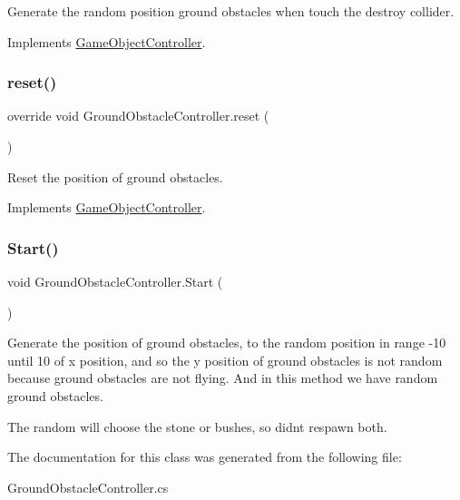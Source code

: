 Generate the random position ground obstacles when touch the destroy collider. 



Implements \hyperlink{class_game_object_controller_a0d186d143e280869efaff7835730fc82}{Game\+Object\+Controller}.

\hypertarget{class_ground_obstacle_controller_ab218c8d1be89a93ab3c0a18ba3fc9d67}{}\label{class_ground_obstacle_controller_ab218c8d1be89a93ab3c0a18ba3fc9d67} 
\subsubsection{\texorpdfstring{reset()}{reset()}}
{\footnotesize\ttfamily override void Ground\+Obstacle\+Controller.\+reset (\begin{DoxyParamCaption}{ }\end{DoxyParamCaption})\hspace{0.3cm}{\ttfamily [virtual]}}



Reset the position of ground obstacles. 



Implements \hyperlink{class_game_object_controller_a5e57dfd66120a1400e5947f5664a41e4}{Game\+Object\+Controller}.

\hypertarget{class_ground_obstacle_controller_ac03d4b2a3dc70e560a8ffa100035400e}{}\label{class_ground_obstacle_controller_ac03d4b2a3dc70e560a8ffa100035400e} 
\subsubsection{\texorpdfstring{Start()}{Start()}}
{\footnotesize\ttfamily void Ground\+Obstacle\+Controller.\+Start (\begin{DoxyParamCaption}{ }\end{DoxyParamCaption})\hspace{0.3cm}{\ttfamily [private]}}



Generate the position of ground obstacles, to the random position in range -\/10 until 10 of x position, and so the y position of ground obstacles is not random because ground obstacles are not flying. And in this method we have random ground obstacles. 

The random will choose the stone or bushes, so didn\textquotesingle{}t respawn both.



The documentation for this class was generated from the following file\+:\begin{DoxyCompactItemize}
\item 
Ground\+Obstacle\+Controller.\+cs\end{DoxyCompactItemize}
